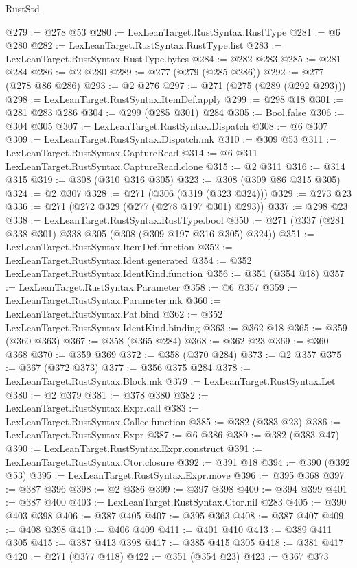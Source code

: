 \begin{lexlean}{RustStd}
\begin{coremodule}
{\begin{coremodule}
{{{{{{{{{{{{{{@279 := @278 @53
@280 := LexLeanTarget.RustSyntax.RustType
@281 := @6 @280
@282 := LexLeanTarget.RustSyntax.RustType.list
@283 := LexLeanTarget.RustSyntax.RustType.bytes
@284 := @282 @283
@285 := @281 @284
@286 := @2 @280
@289 := @277 (@279 (@285 @286))
@292 := @277 (@278 @86 @286)
@293 := @2 @276
@297 := @271 (@275 (@289 (@292 @293)))
@298 := LexLeanTarget.RustSyntax.ItemDef.apply
@299 := @298 @18
@301 := @281 @283 @286
@304 := @299 (@285 @301) @284
@305 := Bool.false
@306 := @304 @305
@307 := LexLeanTarget.RustSyntax.Dispatch
@308 := @6 @307
@309 := LexLeanTarget.RustSyntax.Dispatch.mk
@310 := @309 @53
@311 := LexLeanTarget.RustSyntax.CaptureRead
@314 := @6 @311 LexLeanTarget.RustSyntax.CaptureRead.clone
@315 := @2 @311
@316 := @314 @315
@319 := @308 (@310 @316 @305)
@323 := @308 (@309 @86 @315 @305)
@324 := @2 @307
@328 := @271 (@306 (@319 (@323 @324)))
@329 := @273 @23
@336 := @271 (@272 @329 (@277 (@278 @197 @301) @293))
@337 := @298 @23
@338 := LexLeanTarget.RustSyntax.RustType.bool
@350 := @271 (@337 (@281 @338 @301) @338 @305 (@308 (@309 @197 @316 @305) @324))
@351 := LexLeanTarget.RustSyntax.ItemDef.function
@352 := LexLeanTarget.RustSyntax.Ident.generated
@354 := @352 LexLeanTarget.RustSyntax.IdentKind.function
@356 := @351 (@354 @18)
@357 := LexLeanTarget.RustSyntax.Parameter
@358 := @6 @357
@359 := LexLeanTarget.RustSyntax.Parameter.mk
@360 := LexLeanTarget.RustSyntax.Pat.bind
@362 := @352 LexLeanTarget.RustSyntax.IdentKind.binding
@363 := @362 @18
@365 := @359 (@360 @363)
@367 := @358 (@365 @284)
@368 := @362 @23
@369 := @360 @368
@370 := @359 @369
@372 := @358 (@370 @284)
@373 := @2 @357
@375 := @367 (@372 @373)
@377 := @356 @375 @284
@378 := LexLeanTarget.RustSyntax.Block.mk
@379 := LexLeanTarget.RustSyntax.Let
@380 := @2 @379
@381 := @378 @380
@382 := LexLeanTarget.RustSyntax.Expr.call
@383 := LexLeanTarget.RustSyntax.Callee.function
@385 := @382 (@383 @23)
@386 := LexLeanTarget.RustSyntax.Expr
@387 := @6 @386
@389 := @382 (@383 @47)
@390 := LexLeanTarget.RustSyntax.Expr.construct
@391 := LexLeanTarget.RustSyntax.Ctor.closure
@392 := @391 @18
@394 := @390 (@392 @53)
@395 := LexLeanTarget.RustSyntax.Expr.move
@396 := @395 @368
@397 := @387 @396
@398 := @2 @386
@399 := @397 @398
@400 := @394 @399
@401 := @387 @400
@403 := LexLeanTarget.RustSyntax.Ctor.nil @283
@405 := @390 @403 @398
@406 := @387 @405
@407 := @395 @363
@408 := @387 @407
@409 := @408 @398
@410 := @406 @409
@411 := @401 @410
@413 := @389 @411 @305
@415 := @387 @413 @398
@417 := @385 @415 @305
@418 := @381 @417
@420 := @271 (@377 @418)
@422 := @351 (@354 @23)
@423 := @367 @373
}}}}}}}}}}}}}}
\end{coremodule}}
\end{coremodule}
\end{lexlean}
